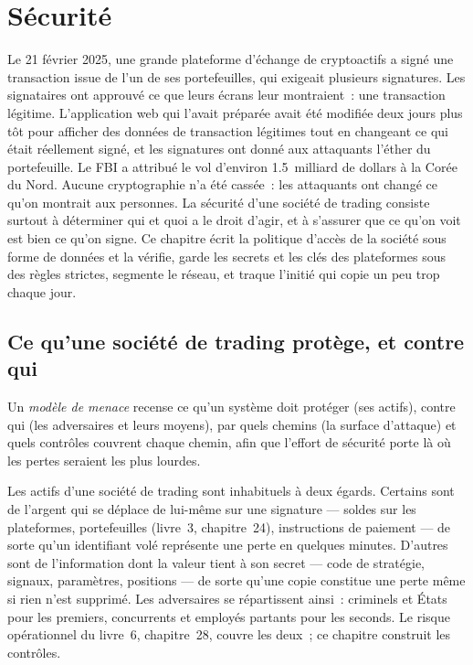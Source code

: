 \chapter{Sécurité}\label{ch:pl:security}

Le 21 février 2025, une grande plateforme d'échange de cryptoactifs a signé une transaction issue de l'un de ses portefeuilles, qui exigeait plusieurs signatures. Les signataires
ont approuvé ce que leurs écrans leur montraient~: une transaction légitime. L'application web qui l'avait préparée avait été modifiée deux jours plus tôt pour
afficher des données de transaction légitimes tout en changeant ce qui était réellement signé, et les signatures ont donné aux attaquants l'éther du portefeuille. Le
FBI a attribué le vol d'environ 1.5~milliard de dollars à la Corée du Nord. Aucune cryptographie n'a été cassée~: les attaquants ont changé ce qu'on montrait aux personnes.
La sécurité d'une société de trading consiste surtout à déterminer qui et quoi a le droit d'agir, et à s'assurer que ce qu'on voit est bien ce qu'on signe. Ce chapitre
écrit la politique d'accès de la société sous forme de données et la vérifie, garde les secrets et les clés des plateformes sous des règles strictes, segmente le réseau,
et traque l'initié qui copie un peu trop chaque jour.

\section{Ce qu'une société de trading protège, et contre qui}

\begin{definition}\label{def:pl:security:threat}
Un \emph{modèle de menace} recense ce qu'un système doit protéger (ses actifs), contre qui (les adversaires et leurs moyens), par quels chemins (la
surface d'attaque) et quels contrôles couvrent chaque chemin, afin que l'effort de sécurité porte là où les pertes seraient les plus lourdes.
\end{definition}

Les actifs d'une société de trading sont inhabituels à deux égards. Certains sont de l'argent qui se déplace de lui-même sur une signature --- soldes sur les plateformes, portefeuilles (livre~3,
chapitre~24), instructions de paiement --- de sorte qu'un identifiant volé représente une perte en quelques minutes. D'autres sont de l'information dont la valeur tient à son secret ---
code de stratégie, signaux, paramètres, positions --- de sorte qu'une copie constitue une perte même si rien n'est supprimé. Les adversaires se répartissent ainsi~: criminels et
États pour les premiers, concurrents et employés partants pour les seconds. Le risque opérationnel du livre~6, chapitre~28, couvre les deux~; ce
chapitre construit les contrôles.

